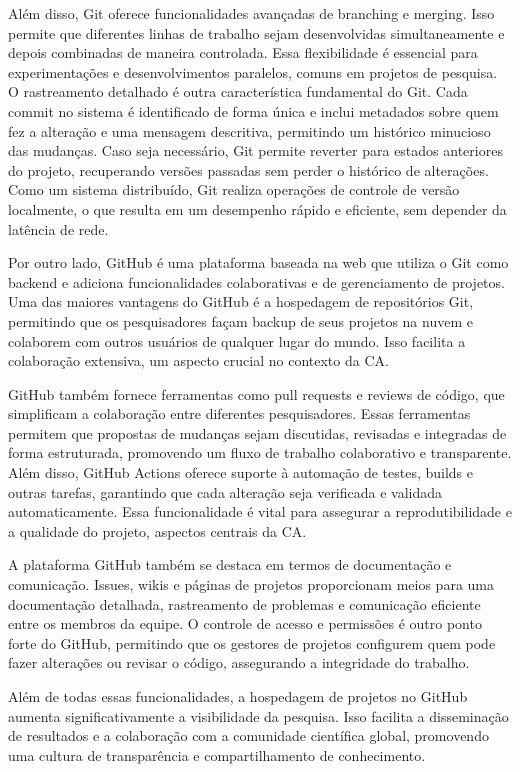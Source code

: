 \documentclass[
  a4paper,
]{book}
\begin{document}
Além disso, Git oferece funcionalidades avançadas de branching e
merging. Isso permite que diferentes linhas de trabalho sejam
desenvolvidas simultaneamente e depois combinadas de maneira controlada.
Essa flexibilidade é essencial para experimentações e desenvolvimentos
paralelos, comuns em projetos de pesquisa. O rastreamento detalhado é
outra característica fundamental do Git. Cada commit no sistema é
identificado de forma única e inclui metadados sobre quem fez a
alteração e uma mensagem descritiva, permitindo um histórico minucioso
das mudanças. Caso seja necessário, Git permite reverter para estados
anteriores do projeto, recuperando versões passadas sem perder o
histórico de alterações. Como um sistema distribuído, Git realiza
operações de controle de versão localmente, o que resulta em um
desempenho rápido e eficiente, sem depender da latência de rede.

Por outro lado, GitHub é uma plataforma baseada na web que utiliza o Git
como backend e adiciona funcionalidades colaborativas e de gerenciamento
de projetos. Uma das maiores vantagens do GitHub é a hospedagem de
repositórios Git, permitindo que os pesquisadores façam backup de seus
projetos na nuvem e colaborem com outros usuários de qualquer lugar do
mundo. Isso facilita a colaboração extensiva, um aspecto crucial no
contexto da CA.

GitHub também fornece ferramentas como pull requests e reviews de
código, que simplificam a colaboração entre diferentes pesquisadores.
Essas ferramentas permitem que propostas de mudanças sejam discutidas,
revisadas e integradas de forma estruturada, promovendo um fluxo de
trabalho colaborativo e transparente. Além disso, GitHub Actions oferece
suporte à automação de testes, builds e outras tarefas, garantindo que
cada alteração seja verificada e validada automaticamente. Essa
funcionalidade é vital para assegurar a reprodutibilidade e a qualidade
do projeto, aspectos centrais da CA.

A plataforma GitHub também se destaca em termos de documentação e
comunicação. Issues, wikis e páginas de projetos proporcionam meios para
uma documentação detalhada, rastreamento de problemas e comunicação
eficiente entre os membros da equipe. O controle de acesso e permissões
é outro ponto forte do GitHub, permitindo que os gestores de projetos
configurem quem pode fazer alterações ou revisar o código, assegurando a
integridade do trabalho.

Além de todas essas funcionalidades, a hospedagem de projetos no GitHub
aumenta significativamente a visibilidade da pesquisa. Isso facilita a
disseminação de resultados e a colaboração com a comunidade científica
global, promovendo uma cultura de transparência e compartilhamento de
conhecimento.
\end{document}
